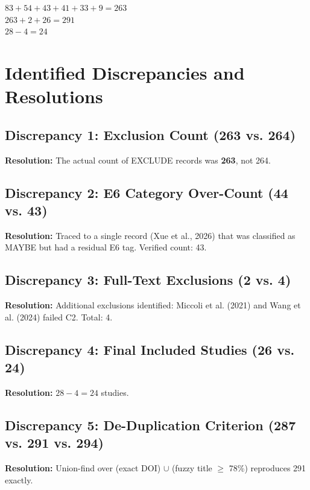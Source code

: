 \documentclass[11pt, a4paper]{article}
\begin{document}
\begin{successbox}
$83 + 54 + 43 + 41 + 33 + 9 = 263$ \checkmark \\
$263 + 2 + 26 = 291$ \checkmark \\
$28 - 4 = 24$ \checkmark
\end{successbox}

\section{Identified Discrepancies and Resolutions}

\subsection{Discrepancy 1: Exclusion Count (263 vs. 264)}

\textbf{Resolution:} The actual count of EXCLUDE records was \textbf{263}, not 264.

\subsection{Discrepancy 2: E6 Category Over-Count (44 vs. 43)}

\textbf{Resolution:} Traced to a single record (Xue et al., 2026) that was classified as MAYBE but had a residual E6 tag. Verified count: 43.

\subsection{Discrepancy 3: Full-Text Exclusions (2 vs. 4)}

\textbf{Resolution:} Additional exclusions identified: Miccoli et al. (2021) and Wang et al. (2024) failed C2. Total: 4.

\subsection{Discrepancy 4: Final Included Studies (26 vs. 24)}

\textbf{Resolution:} $28 - 4 = 24$ studies.

\subsection{Discrepancy 5: De-Duplication Criterion (287 vs. 291 vs. 294)}

\textbf{Resolution:} Union-find over (exact DOI) $\cup$ (fuzzy title $\geq$ 78\%) reproduces 291 exactly.
\end{document}
